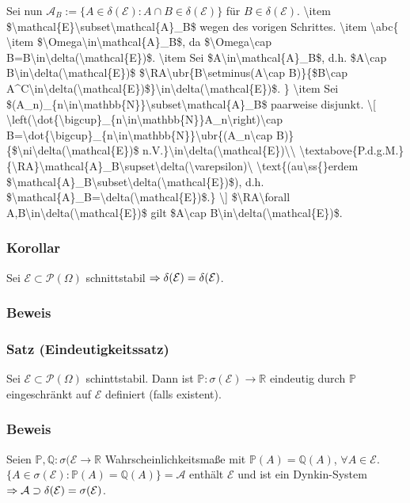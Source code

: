 Sei nun $\mathcal{A}_B:=\{A\in\delta(\mathcal{E})\colon A\cap B\in\delta(\mathcal{E})\}$ f\"ur $B\in\delta(\mathcal{E})$.
\num{
\item $\mathcal{E}\subset\mathcal{A}_B$ wegen des vorigen Schrittes.
\item
\abc{
\item $\Omega\in\mathcal{A}_B$, da $\Omega\cap B=B\in\delta(\mathcal{E})$.
\item Sei $A\in\mathcal{A}_B$, d.h. $A\cap B\in\delta(\mathcal{E})$ $\RA\ubr{B\setminus(A\cap B)}{$B\cap A^C\in\delta(\mathcal{E})$}\in\delta(\mathcal{E})$.
}
\item Sei $(A_n)_{n\in\mathbb{N}}\subset\mathcal{A}_B$ paarweise disjunkt.
\[
\left(\dot{\bigcup}_{n\in\mathbb{N}}A_n\right)\cap B=\dot{\bigcup}_{n\in\mathbb{N}}\ubr{(A_n\cap B)}{$\ni\delta(\mathcal{E})$ n.V.}\in\delta(\mathcal{E})\\
\textabove{P.d.g.M.}{\RA}\mathcal{A}_B\supset\delta(\varepsilon)\ \text{(au\ss{}erdem $\mathcal{A}_B\subset\delta(\mathcal{E})$), d.h. $\mathcal{A}_B=\delta(\mathcal{E})$.}
\]
$\RA\forall A,B\in\delta(\mathcal{E})$ gilt $A\cap B\in\delta(\mathcal{E})$.
}
\subsubsection{Korollar}
Sei $\mathcal{E}\subset\mathcal{P}(\Omega)$ schnittstabil $\Rightarrow\delta(\mathcal{E})=\delta(\mathcal{E})$.
\subsubsection{Beweis}
\subsubsection{Satz (Eindeutigkeitssatz)}
Sei $\mathcal{E}\subset\mathcal{P}(\Omega)$ schinttstabil. Dann ist $\mathbb{P}\colon\sigma(\mathcal{E})\to\mathbb{R}$ eindeutig durch $\mathbb{P}$ eingeschr\"ankt auf $\mathcal{E}$ definiert (falls existent).
\subsubsection{Beweis}
Seien $\mathbb{P},\mathbb{Q}\colon\sigma(\mathcal{E}\to\mathbb{R}$ Wahrscheinlichkeitsma\ss{}e mit $\mathbb{P}(A)=\mathbb{Q}(A)$, $\forall A\in\mathcal{E}$. $\{A\in\sigma(\mathcal{E})\colon\mathbb{P}(A)=\mathbb{Q}(A)\}=\mathcal{A}$ enth\"alt $\mathcal{E}$ und ist ein Dynkin-System $\Rightarrow\mathcal{A}\supset\delta(\mathcal{E})=\sigma(\mathcal{E})$.
